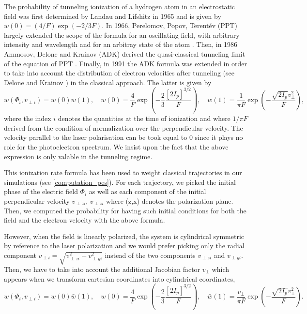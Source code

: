 \documentclass[a4paper]{article}
\begin{document}
The probability of tunneling ionization of a hydrogen atom in an electrostatic field was first determined by Landau and Lifshitz in 1965 \cite{Landau_1965} and is given by $w(0)=(4/F)\exp(-2/3F)$. In 1966, Perelomov, Popov, Terent\'ev (PPT) largely extended the scope of the formula for an oscillating field, with arbitrary intensity and wavelength and for an arbitray state of the atom \cite{PPT_1966}. Then, in 1986 Ammosov, Delone and Krainov (ADK) derived the quasi-classical tunneling limit of the equation of PPT \cite{ADK_1986}. Finally, in 1991 the ADK formula was extended in order to take into account the distribution of electron velocities after tunneling (see Delone and Krainov \cite{Delone_1991}) in the classical approach. The latter is given by
\begin{equation} 
\label{ADK_distribution}
w(\Phi_{i},v_{\perp i})=w(0)w(1), \quad w(0)=\frac{4}{F}\exp(-\frac{2}{3}\frac{[2I_{p}]^{3/2}}{F}), \quad w(1)=\frac{1}{\pi F}\exp(-\frac{\sqrt{2I_{p}}v_{\perp}^{2}}{F}),
\end{equation}
where the index $i$ denotes the quantities at the time of ionization and where $1/\pi F$ derived from the condition of normalization over the perpendicular velocity. 
The velocity parallel to the laser polarisation can be took equal to 0 since it plays no role for the photoelectron spectrum. We insist upon the fact that the above expression is only valable in the tunneling regime.
\par
This ionization rate formula has been used to weight classical trajectories in our simulations (see \ref{computation_pes}). For each trajectory, we picked the initial phase of the electric field $\Phi_{i}$ as well as each component of the initial perpendicular velocity $v_{\perp z i}$, $v_{\perp z i}$ where (z,x) denotes the polarization plane. Then, we computed the probability for having such initial conditions for both the field and the electron velocity with the above formula.
\par
However, when the field is linearly polarized, the system is cylindrical symmetric by reference to the laser polarization and we would prefer picking only the radial component $v_{\perp i}=\sqrt{v_{\perp z i}^{2} + v_{\perp y i}^{2}}$ instead of the two components $v_{\perp z i}$ and $v_{\perp y i}$. Then, we have to take into account the additional Jacobian factor $v_{\perp}$ which appears when we transform cartesian coordinates into cylindrical coordinates,
\begin{equation}
\label{ADK_distribution_linear}
w(\Phi_{i},v_{\perp i})=w(0)\bar w(1), \quad w(0)=\frac{4}{F}\exp(-\frac{2}{3}\frac{[2I_{p}]^{3/2}}{F}), \quad \bar w(1)=\frac{v_{\perp}}{\pi F}\exp(-\frac{\sqrt{2I_{p}}v_{\perp}^{2}}{F}).
\end{equation}
\end{document}
